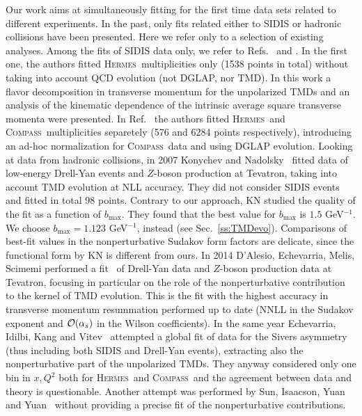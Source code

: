 \documentclass[aps,preprintnumbers,showpacs,nofootinbib,superscriptaddress,floatfix]{revtex4}
\newcommand{\hermes}{\textsc{Hermes}}
\newcommand{\compass}{\textsc{Compass}}
\begin{document}
Our work aims at simultaneously fitting for the first time data sets related to different experiments. 
In the past, only fits related either to SIDIS or hadronic collisions have been presented. Here we refer only to a selection of existing analyses. 
Among the fits of SIDIS data only, we refer to Refs.~\cite{Signori:2013mda}
and
\cite{Anselmino:2013lza}. In the first one, the authors fitted \hermes\ multiplicities only (1538 points in total) without taking into account QCD evolution (not DGLAP, nor TMD). In this work a flavor decomposition in transverse momentum for the unpolarized TMDs and an analysis of the kinematic dependence of the intrinsic average square transverse momenta were presented. 
In Ref.~\cite{Anselmino:2013lza} the authors fitted \hermes\ and \compass\ multiplicities separetely (576 and 6284 points respectively), introducing an ad-hoc normalization for \compass\ data and using DGLAP evolution. 
Looking at data from hadronic collisions, in 2007 Konychev and Nadolsky~\cite{Konychev:2005iy} fitted data of low-energy Drell-Yan events and $Z$-boson production at Tevatron, taking into account TMD evolution at NLL accuracy. They did not consider SIDIS events and fitted in total 98 points. Contrary to our approach, KN studied the quality of the fit as a function of $b_{\text{max}}$. They found that the best value for $b_{\text{max}}$ is $1.5$ GeV$^{-1}$. We choose $b_{\text{max}}=1.123$ GeV$^{-1}$, instead (see Sec.~\ref{ss:TMDevo}). Comparisons of best-fit values in the nonperturbative Sudakov form factors are delicate, since the functional form by KN is different from ours.
In 2014 D'Alesio, Echevarria, Melis, Scimemi performed a fit~\cite{DAlesio:2014mrz} of Drell-Yan data and $Z$-boson production data at Tevatron, focusing in particular on the role of the nonperturbative contribution to the kernel of TMD evolution. This is the fit with the highest accuracy in transverse momentum resummation performed up to date (NNLL in the Sudakov exponent and ${\cal O}(\alpha_s)$ in the Wilson coefficients). 
In the same year Echevarria, Idilbi, Kang and Vitev~\cite{Echevarria:2014xaa} attempted a global fit of data for the Sivers asymmetry (thus including both SIDIS and Drell-Yan events), extracting also the nonperturbative part of the unpolarized TMDs. They anyway considered only one bin in $x, Q^2$ both for \hermes\ and \compass\ and the agreement between data and theory is questionable. 
Another attempt was performed by Sun, Isaacson, Yuan and Yuan~\cite{Su:2014wpa} without providing a precise fit of the nonperturbative contributions.
\end{document}

